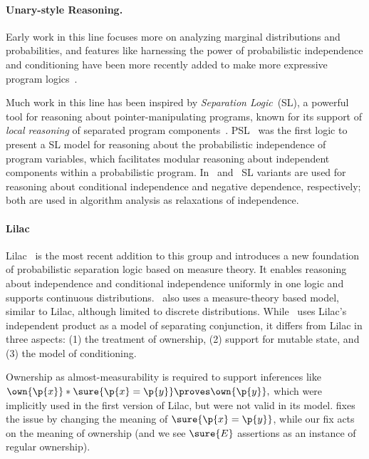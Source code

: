 \documentclass[acmsmall,nonacm,screen,appendix]{acmart}
\begin{document}
\paragraph{\bfseries Unary-style Reasoning.}
Early work in this line focuses more on analyzing marginal distributions and probabilities, and features like harnessing the power of  probabilistic independence and conditioning have been more recently added to make more expressive program logics~\cite{ramshaw1979formalizing,rand2015vphl,barthe2016ellora,barthe2019probabilistic,bao2022separation,lilac}.

Much work in this line has been inspired by {\em Separation Logic}~(SL),
a powerful tool
for reasoning about pointer-manipulating programs,
known for its support of \emph{local reasoning}
of separated program components~\cite{reynolds2000intuitionistic}.
PSL~\cite{barthe2019probabilistic} was the first logic to present a SL model for reasoning about the probabilistic independence of program variables, which facilitates modular reasoning about independent components within a probabilistic program.
In~\cite{bao2021bunched} and~\cite{bao2022separation} SL variants are used for reasoning about conditional independence and negative dependence, respectively;
both are used in algorithm analysis as relaxations of
independence.

\paragraph{Lilac}
Lilac~\cite{lilac} is the most recent addition to this group and introduces a new foundation of probabilistic separation logic based on measure theory.
It enables reasoning about independence and conditional independence uniformly in one logic and supports continuous distributions.
\thelogic\ also uses a measure-theory based model, similar to Lilac,
although limited to discrete distributions.
While \thelogic\ uses Lilac's independent product as a model of separating conjunction, it differs from Lilac in three aspects:
(1) the treatment of ownership,
(2) support for mutable state, and
(3) the model of conditioning.

Ownership as almost-measurability is required to support inferences like
$
  \own{\p{x}} * \sure{\p{x}=\p{y}}
  \proves
  \own{\p{y}},
$
which were implicitly used in the first version of Lilac,
but were not valid in its model.
\citet{lilac2} fixes the issue by changing the meaning of $\sure{\p{x}=\p{y}}$,
while our fix acts on the meaning of ownership
(and we see $\sure{E}$ assertions as an instance of regular ownership).
\end{document}
